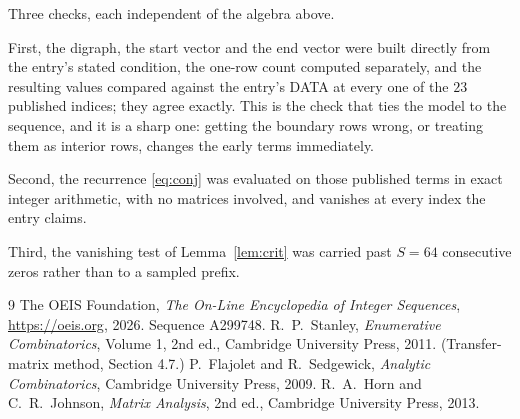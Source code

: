 \documentclass[11pt,a4paper]{article}
\theoremstyle{plain}
\theoremstyle{definition}
\begin{document}
Three checks, each independent of the algebra above.

First, the digraph, the start vector and the end vector were built directly from the
entry's stated condition, the one-row count computed separately, and the resulting values
compared against the entry's DATA at every one of the $23$ published indices; they
agree exactly. This is the check that ties the model to the sequence, and it is a sharp one:
getting the boundary rows wrong, or treating them as interior rows, changes the early terms
immediately.

Second, the recurrence \eqref{eq:conj} was evaluated on those published terms in exact
integer arithmetic, with no matrices involved, and vanishes at every index the entry claims.

Third, the vanishing test of Lemma~\ref{lem:crit} was carried past $S=64$ consecutive
zeros rather than to a sampled prefix.

\begin{thebibliography}{9}
 The OEIS Foundation, \emph{The On-Line Encyclopedia of Integer
Sequences}, \url{https://oeis.org}, 2026. Sequence A299748.
 R.~P.~Stanley, \emph{Enumerative Combinatorics}, Volume 1, 2nd ed.,
Cambridge University Press, 2011. (Transfer-matrix method, Section 4.7.)
 P.~Flajolet and R.~Sedgewick, \emph{Analytic Combinatorics}, Cambridge
University Press, 2009.
 R.~A.~Horn and C.~R.~Johnson, \emph{Matrix Analysis}, 2nd ed., Cambridge
University Press, 2013.
\end{thebibliography}
\end{document}

